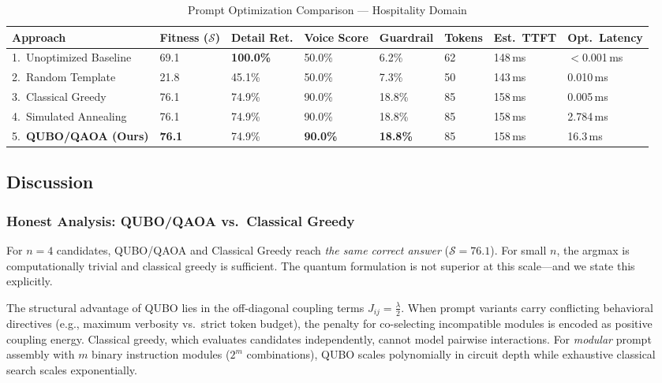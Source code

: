 \documentclass[conference]{IEEEtran}
\begin{document}
\begin{table}[!t]
\caption{Prompt Optimization Comparison --- Hospitality Domain}
\label{tab:qubo_eval}
\centering
\scriptsize
\setlength{\tabcolsep}{3pt}
\begin{tabularx}{\textwidth}{L Y Y Y Y Y Y Y}
\toprule
\textbf{Approach} & \textbf{Fitness ($\mathcal{S}$)} & \textbf{Detail Ret.} & \textbf{Voice Score} & \textbf{Guardrail} & \textbf{Tokens} & \textbf{Est.\ TTFT} & \textbf{Opt.\ Latency} \\
.\ Unoptimized Baseline & 69.1 & \textbf{100.0\%} & 50.0\% & 6.2\% & 62 & 148\,ms & $<$0.001\,ms \\
2.\ Random Template & 21.8 & 45.1\% & 50.0\% & 7.3\% & 50 & 143\,ms & 0.010\,ms \\
3.\ Classical Greedy & 76.1 & 74.9\% & 90.0\% & 18.8\% & 85 & 158\,ms & 0.005\,ms \\
4.\ Simulated Annealing & 76.1 & 74.9\% & 90.0\% & 18.8\% & 85 & 158\,ms & 2.784\,ms \\
5.\ \textbf{QUBO/QAOA (Ours)} & \textbf{76.1} & 74.9\% & \textbf{90.0\%} & \textbf{18.8\%} & 85 & 158\,ms & 16.3\,ms \\
\bottomrule
\end{tabularx}
\end{table}

\subsection{Discussion}

\subsubsection{Honest Analysis: QUBO/QAOA vs.\ Classical Greedy}
For $n = 4$ candidates, QUBO/QAOA and Classical Greedy reach \textit{the same correct answer} ($\mathcal{S} = 76.1$). For small $n$, the argmax is computationally trivial and classical greedy is sufficient. The quantum formulation is not superior at this scale---and we state this explicitly.

The structural advantage of QUBO lies in the off-diagonal coupling terms $J_{ij} = \frac{\lambda}{2}$. When prompt variants carry conflicting behavioral directives (e.g., maximum verbosity vs.\ strict token budget), the penalty for co-selecting incompatible modules is encoded as positive coupling energy. Classical greedy, which evaluates candidates independently, cannot model pairwise interactions. For \textit{modular} prompt assembly with $m$ binary instruction modules ($2^m$ combinations), QUBO scales polynomially in circuit depth while exhaustive classical search scales exponentially.
\end{document}
